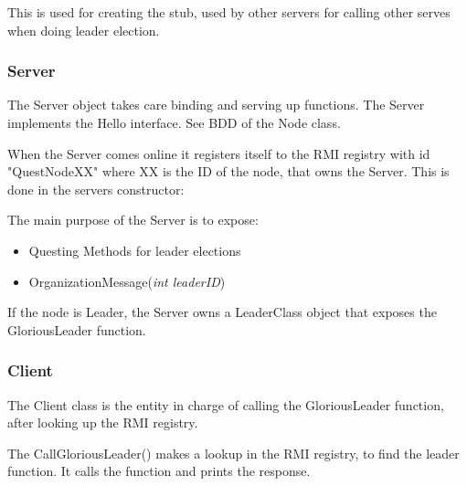 This is used for creating the stub, used by other servers for calling other serves when doing leader election.

\begin{center}
\end{center}

\subsubsection{Server}
The Server object takes care binding and serving up functions. The Server implements the Hello interface. See BDD of the Node class.

When the Server comes online it registers itself to the RMI registry with id "QuestNodeXX" where XX is the ID of the node, that owns the Server. This is done in the servers constructor:

\begin{center}
\end{center}


The main purpose of the Server is to expose:

\begin{itemize}
\item Questing Methods for leader elections
\item OrganizationMessage(\textit{int leaderID})
\end{itemize}

If the node is Leader, the Server owns a LeaderClass object that exposes the GloriousLeader function. 

\subsubsection{Client}
The Client class is the entity in charge of calling the GloriousLeader function, after looking up the RMI registry.

The CallGloriousLeader() makes a lookup in the RMI registry, to find the leader function. It calls the function and prints the response.

\begin{center}
\end{center}

